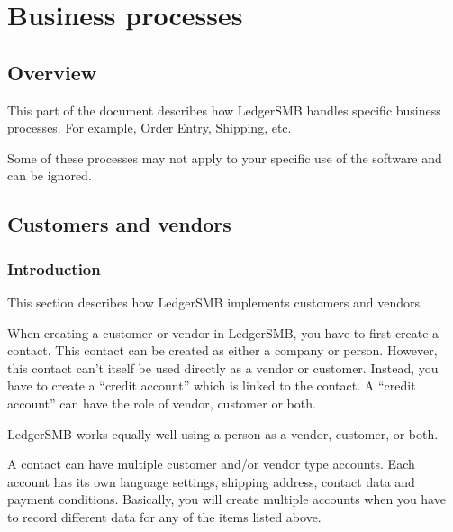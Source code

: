
\part{Business processes}
\label{part-business-processes}

\chapter{Overview}
\label{cha-business-processes-overview}

This part of the document describes how LedgerSMB handles specific business processes.  For example, Order Entry, Shipping, etc.

Some of these processes may not apply to your specific use of the software and
can be ignored.

\chapter{Customers and vendors}
\label{cha-business-processes-customers}

\section{Introduction}
\label{sec-business-processes-customers-intro}

This section describes
how LedgerSMB implements \glspl{customer} and \glspl{vendor}.

When creating a customer or vendor in LedgerSMB, you have to first create a \gls{contact}. 
This contact can be created as either a \gls{company} or person.
However, this contact
can't itself be used directly as a \gls{vendor} or \gls{customer}. 
Instead, you have to create a ``\gls{credit account}'' which is linked to the contact. 
A ``\gls{credit account}'' can have the role of vendor, customer or both.

LedgerSMB works equally well using a person as a vendor, customer, or both.

A contact can have multiple \gls{customer} and/or \gls{vendor} type accounts. Each account has its
own language settings, shipping address, contact data and payment conditions.
Basically, you will create multiple accounts when you have to record different data
for any of the items listed above.

